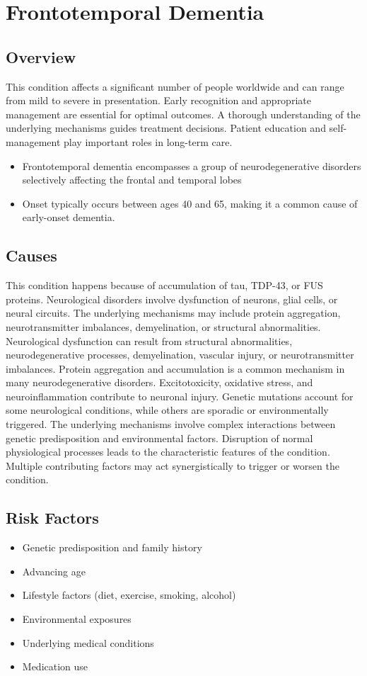 \chapter{Frontotemporal Dementia}
\label{sec:Frontotemporal Dementia}

\section{Overview}
This condition affects a significant number of people worldwide and can range from mild to severe in presentation. Early recognition and appropriate management are essential for optimal outcomes. A thorough understanding of the underlying mechanisms guides treatment decisions. Patient education and self-management play important roles in long-term care.

\begin{itemize}[noitemsep]
  \item Frontotemporal dementia encompasses a group of neurodegenerative disorders selectively affecting the frontal and temporal lobes
  \item Onset typically occurs between ages 40 and 65, making it a common cause of early-onset dementia.
\end{itemize}
\section{Causes}
This condition happens because of accumulation of tau, TDP-43, or FUS proteins. Neurological disorders involve dysfunction of neurons, glial cells, or neural circuits. The underlying mechanisms may include protein aggregation, neurotransmitter imbalances, demyelination, or structural abnormalities. Neurological dysfunction can result from structural abnormalities, neurodegenerative processes, demyelination, vascular injury, or neurotransmitter imbalances. Protein aggregation and accumulation is a common mechanism in many neurodegenerative disorders. Excitotoxicity, oxidative stress, and neuroinflammation contribute to neuronal injury. Genetic mutations account for some neurological conditions, while others are sporadic or environmentally triggered. The underlying mechanisms involve complex interactions between genetic predisposition and environmental factors. Disruption of normal physiological processes leads to the characteristic features of the condition. Multiple contributing factors may act synergistically to trigger or worsen the condition.
\section{Risk Factors}
\begin{itemize}[noitemsep]
  \item Genetic predisposition and family history
  \item Advancing age
  \item Lifestyle factors (diet, exercise, smoking, alcohol)
  \item Environmental exposures
  \item Underlying medical conditions
  \item Medication use
\end{itemize}
